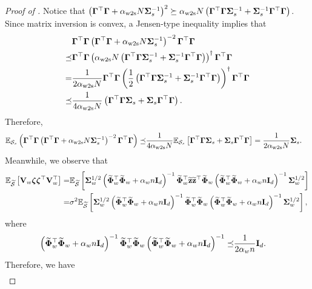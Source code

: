 \begin{proof}[Proof of ]
    Notice that $\rbr{\Gammab^\top \Gammab + \alpha_\wts N \Sigmab_s^{-1}}^{2} \succeq \alpha_\wts N \rbr{\Gammab^\top \Gammab \Sigmab_s^{-1} + \Sigmab_s^{-1} \Gammab^\top \Gammab}$.
    Since matrix inversion is convex, a Jensen-type inequality implies that
    \begin{align*}
        &\Gammab^\top \Gammab \rbr{\Gammab^\top \Gammab + \alpha_\wts N \Sigmab_s^{-1}}^{-2} \Gammab^\top \Gammab \\
        \preceq &\Gammab^\top \Gammab \rbr{\alpha_\wts N \rbr{\Gammab^\top \Gammab \Sigmab_s^{-1} + \Sigmab_s^{-1} \Gammab^\top \Gammab}}^{\dagger} \Gammab^\top \Gammab \\
        = &\frac{1}{2 \alpha_\wts N} \Gammab^\top \Gammab \rbr{\frac{1}{2} \rbr{\Gammab^\top \Gammab \Sigmab_s^{-1} + \Sigmab_s^{-1} \Gammab^\top \Gammab}}^{\dagger} \Gammab^\top \Gammab \\
        \preceq &\frac{1}{4 \alpha_\wts N} \rbr{\Gammab^\top \Gammab \Sigmab_s + \Sigmab_s \Gammab^\top \Gammab}.
    \end{align*}
    Therefore, 
    \begin{align*}
        \E_{\Scal_s}\rbr{\Gammab^\top \Gammab \rbr{\Gammab^\top \Gammab + \alpha_\wts N \Sigmab_s^{-1}}^{-2} \Gammab^\top \Gammab}
        \preceq &\frac{1}{4 \alpha_\wts N} \E_{\Scal_s}\sbr{\Gammab^\top \Gammab \Sigmab_s + \Sigmab_s \Gammab^\top \Gammab} 
        = \frac{1}{2 \alpha_\wts N} \Sigmab_s.
    \end{align*}
    Meanwhile, we observe that
    \begin{align*}
        \E_{\wt\Scal}\sbr{\Vb_w \zetab \zetab^\top \Vb_w^\top} 
        = &\E_{\wt\Scal}\sbr{\Sigmab_w^{1/2} \rbr{\wt\Phib_w^\top \wt\Phib_w + \alpha_w n \Ib_d}^{-1} \wt\Phib_w^\top \wt\zb \wt\zb^\top \wt\Phib_w \rbr{\wt\Phib_w^\top \wt\Phib_w + \alpha_w n \Ib_d}^{-1} \Sigmab_w^{1/2}} \\
        = &\sigma^2 \E_{\wt\Scal}\sbr{\Sigmab_w^{1/2} \rbr{\wt\Phib_w^\top \wt\Phib_w + \alpha_w n \Ib_d}^{-1} \wt\Phib_w^\top \wt\Phib_w \rbr{\wt\Phib_w^\top \wt\Phib_w + \alpha_w n \Ib_d}^{-1} \Sigmab_w^{1/2}},
    \end{align*}
    where 
    \begin{align*}
        \rbr{\wt\Phib_w^\top \wt\Phib_w + \alpha_w n \Ib_d}^{-1} \wt\Phib_w^\top \wt\Phib_w \rbr{\wt\Phib_w^\top \wt\Phib_w + \alpha_w n \Ib_d}^{-1}
        \preceq &\frac{1}{2 \alpha_w n} \Ib_d.
    \end{align*}
    Therefore, we have
    \begin{align*}

\end{align*}
\end{proof}
